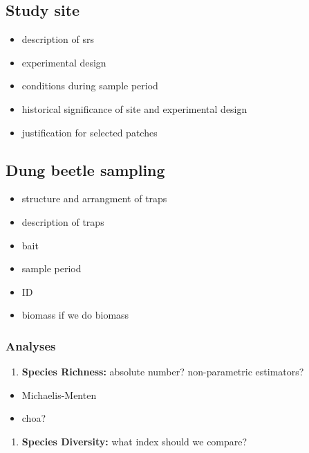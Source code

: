 \documentclass[
]{article}
\providecommand{\tightlist}{%
  \setlength{\itemsep}{0pt}\setlength{\parskip}{0pt}}
\begin{document}
\hypertarget{study-site}{%
\subsection{Study site}\label{study-site}}

\begin{itemize}
\tightlist
\item
  description of srs
\item
  experimental design
\item
  conditions during sample period
\item
  historical significance of site and experimental design
\item
  justification for selected patches
\end{itemize}

\hypertarget{dung-beetle-sampling}{%
\subsection{Dung beetle sampling}\label{dung-beetle-sampling}}

\begin{itemize}
\tightlist
\item
  structure and arrangment of traps
\item
  description of traps
\item
  bait
\item
  sample period
\item
  ID
\item
  biomass if we do biomass
\end{itemize}

\hypertarget{analyses}{%
\subsubsection{Analyses}\label{analyses}}

\begin{enumerate}
\def\labelenumi{\arabic{enumi}.}
\tightlist
\item
  \textbf{Species Richness:} absolute number? non-parametric estimators?
\end{enumerate}

\begin{itemize}
\tightlist
\item
  Michaelis-Menten
\item
  choa?
\end{itemize}

\begin{enumerate}
\def\labelenumi{\arabic{enumi}.}
\tightlist
\item
  \textbf{Species Diversity:} what index should we compare?
\end{enumerate}
\end{document}
